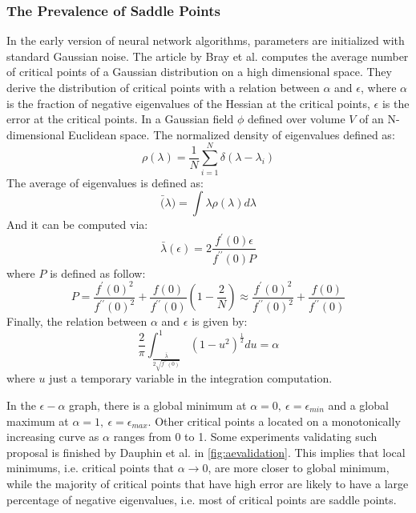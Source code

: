 \subsubsection{The Prevalence of Saddle Points}
\label{sssec:Saddle}
In the early version of neural network algorithms, parameters are initialized
with standard Gaussian noise. The article by Bray et al. \parencite{bray2007statistics}
computes the average number of critical points of a Gaussian distribution
on a high dimensional space. They derive the distribution of critical points
with a relation between $ \alpha $ and $ \epsilon $, where $ \alpha $ is
the fraction of negative eigenvalues of the Hessian at the critical points, 
$ \epsilon $ is the error at the critical points. In a Gaussian field $ \phi $
defined over volume $ V $ of an N-dimensional Euclidean space. The normalized
density of eigenvalues defined as:
\begin{equation}
    \rho(\lambda) = \frac{1}{N}\sum\limits_{i=1}^N\delta(\lambda-\lambda_i)
\end{equation}
The average of eigenvalues is defined as:
\begin{equation}
    \bar(\lambda)=\int \lambda\rho(\lambda) d\lambda
\end{equation}
And it can be computed via:
\begin{equation}
    \bar{\lambda}(\epsilon)=2 \frac{f^{\prime}(0) \epsilon}{f^{\prime \prime}(0) P}
\end{equation}
where $ P $ is defined as follow:
\begin{equation}
    P=\frac{f^{\prime}(0)^{2}}{f^{\prime \prime}(0)^{2}}+\frac{f(0)}{f^{\prime \prime}(0)}\left(1-\frac{2}{N}\right) \approx \frac{f^{\prime}(0)^{2}}{f^{\prime \prime}(0)^{2}}+\frac{f(0)}{f^{\prime \prime}(0)}
\end{equation}
Finally, the relation between $ \alpha $ and $ \epsilon $ is given by:
\begin{equation}
    \frac{2}{\pi} \int_{\frac{\bar{\lambda}}{2 \sqrt{f^{\prime \prime}(0)}}}^{1} (1-u^{2})^{\frac{1}{2}}du=\alpha
\end{equation}
where $ u $ just a temporary variable in the integration computation. 
\par In the $ \epsilon-\alpha $ graph, there is a global minimum at 
$ \alpha = 0,\ \epsilon = \epsilon_{min} $ and 
a global maximum at $ \alpha = 1,\ \epsilon = \epsilon_{max} $. Other 
critical points a located on a monotonically increasing curve as $ \alpha $
ranges from 0 to 1. Some experiments validating such proposal is finished 
by Dauphin et al. \parencite{dauphin2014identifying} in \autoref{fig:aevalidation}.
This implies that local minimums, i.e. critical points
that $ \alpha\rightarrow 0 $, are more closer to global minimum, while 
the majority of critical points that have high error are likely to have 
a large percentage of negative eigenvalues, i.e. most of critical points 
are saddle points.

